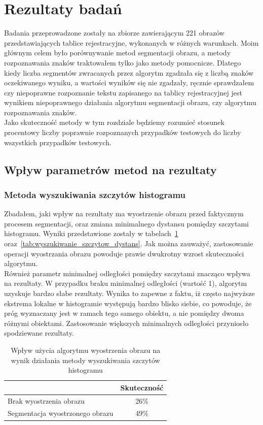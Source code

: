 \section{Rezultaty badań}
Badania przeprowadzone zostały na zbiorze zawierającym 221 obrazów przedstawiających tablice rejestracyjne, wykonanych w różnych warunkach. Moim głównym celem było porównywanie metod segmentacji obrazu, a metody rozpoznawania znaków traktowałem tylko jako metody pomocnicze. Dlatego kiedy liczba segmentów zwracanych przez algorytm zgadzała się z liczbą znaków oczekiwanego wyniku, a wartości wyników się nie zgadzały, ręcznie sprawdzałem czy niepoprawne rozpoznanie tekstu zapisanego na tablicy rejestracyjnej jest wynikiem niepoprawnego działania algorytmu segmentacji obrazu, czy algorytmu rozpoznawania znaków. \\
Jako skuteczność metody w tym rozdziale będziemy rozumieć stosunek procentowy liczby poprawnie rozpoznanych przypadków testowych do liczby wszystkich przypadków testowych.

\subsection{Wpływ parametrów metod na rezultaty}
\subsubsection{Metoda wyszukiwania szczytów histogramu}\label{sssec:histogram_peaks_results}
Zbadałem, jaki wpływ na rezultaty ma wyostrzenie obrazu przed faktycznym procesem segmentacji, oraz zmiana minimalnego dystansu pomiędzy szczytami histogramu. Wyniki przedstawione zostały w tabelach~\ref{tab:wyszukiwanie_szczytow_wyostrz} oraz~\ref{tab:wyszukiwanie_szczytow_dystans}. Jak można zauważyć, zastosowanie operacji wyostrzania obrazu powoduje prawie dwukrotny wzrost skuteczności algorytmu. \\
Również parametr minimalnej odległości pomiędzy szczytami znacząco wpływa na rezultaty. W przypadku braku minimalnej odległości (wartość 1), algorytm uzyskuje bardzo słabe rezultaty. Wynika to zapewne z faktu, iż często najwyższe ekstrema lokalne w histogramie występują bardzo blisko siebie, co powoduje, że próg wyznaczany jest w ramach tego samego obiektu, a nie pomiędzy dwoma różnymi obiektami. Zastosowanie większych minimalnych odległości przyniosło spodziewane rezultaty. 

\begin {table}[H]
  \begin{center}
    \begin{tabular}{l | c}
      \space & Skuteczność \\
      \hline
      Brak wyostrzenia obrazu & 26\% \\
      Segmentacja wyostrzonego obrazu & 49\%
    \end{tabular}
    \caption {Wpływ użycia algorytmu wyostrzenia obrazu na wynik działania metody wyszukiwania szczytów histogramu}
    \label{tab:wyszukiwanie_szczytow_wyostrz} 
  \end{center}
\end {table}


